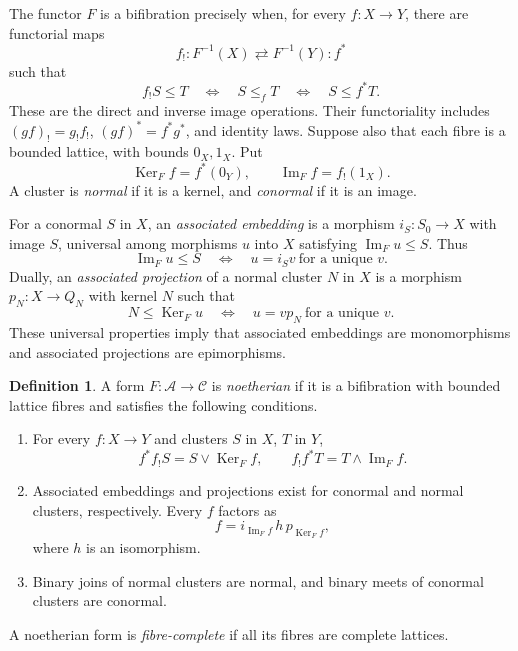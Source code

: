 \documentclass[12pt,a4paper]{amsart}
\theoremstyle{definition}
\newtheorem{definition}[theorem]{Definition}
\newcommand{\im}{\operatorname{Im}}
\newcommand{\Ker}{\operatorname{Ker}}
\newcommand{\C}{\mathcal C}
\newcommand{\A}{\mathcal A}
\begin{document}
The functor $F$ is a bifibration precisely when, for every $f:X\to Y$, there are functorial maps
\[
 f_!:F^{-1}(X)\rightleftarrows F^{-1}(Y):f^*
\]
such that
\begin{equation}\label{eq:galois}
 f_!S\leq T\quad\Longleftrightarrow\quad S\leq_f T
 \quad\Longleftrightarrow\quad S\leq f^*T.
\end{equation}
These are the direct and inverse image operations. Their functoriality includes
$(gf)_!=g_!f_!$, $(gf)^*=f^*g^*$, and identity laws. Suppose also that each fibre is a bounded lattice, with bounds $0_X,1_X$. Put
\[
 \Ker_F f=f^*(0_Y),\qquad \im_F f=f_!(1_X).
\]
A cluster is \emph{normal} if it is a kernel, and \emph{conormal} if it is an image.

For a conormal $S$ in $X$, an \emph{associated embedding} is a morphism
$i_S:S_0\to X$ with image $S$, universal among morphisms $u$ into $X$ satisfying $\im_F u\leq S$. Thus
\begin{equation}\label{eq:embedding}
 \im_F u\leq S\quad\Longleftrightarrow\quad
 u=i_Sv\ \text{for a unique }v.
\end{equation}
Dually, an \emph{associated projection} of a normal cluster $N$ in $X$ is a morphism $p_N:X\to Q_N$ with kernel $N$ such that
\begin{equation}\label{eq:projection}
 N\leq\Ker_F u\quad\Longleftrightarrow\quad
 u=vp_N\ \text{for a unique }v.
\end{equation}
These universal properties imply that associated embeddings are monomorphisms and associated projections are epimorphisms.

\begin{definition}\label{def:nf}
A form $F:\A\to\C$ is \emph{noetherian} if it is a bifibration with bounded lattice fibres and satisfies the following conditions.
\begin{enumerate}[label=\textup{(N\arabic*)}]
\item For every $f:X\to Y$ and clusters $S$ in $X$, $T$ in $Y$,
\begin{equation}\label{eq:nfidentities}
 f^*f_!S=S\vee\Ker_F f,\qquad
 f_!f^*T=T\wedge\im_F f.
\end{equation}
\item Associated embeddings and projections exist for conormal and normal clusters, respectively. Every $f$ factors as
\[
 f=i_{\im_F f}\,h\,p_{\Ker_F f},
\]
where $h$ is an isomorphism.
\item Binary joins of normal clusters are normal, and binary meets of conormal clusters are conormal.
\end{enumerate}
A noetherian form is \emph{fibre-complete} if all its fibres are complete lattices.
\end{definition}
\end{document}
